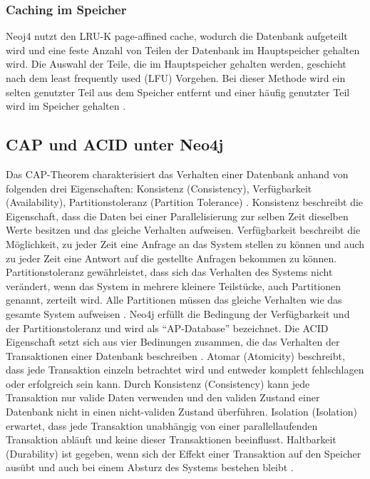 \subsubsection{Caching im Speicher}
Neoj4 nutzt den LRU-K page-affined cache, wodurch die Datenbank aufgeteilt wird und eine feste Anzahl von Teilen der Datenbank im Hauptspeicher gehalten wird. Die Auswahl der Teile, die im Hauptspeicher gehalten werden, geschieht nach dem least frequently used (LFU) Vorgehen. Bei dieser Methode wird ein selten genutzter Teil aus dem Speicher entfernt und einer häufig genutzter Teil wird im Speicher gehalten \parencite{robinson2013graph}.
\subsection{CAP und ACID unter Neo4j}
Das CAP-Theorem charakterisiert das Verhalten einer Datenbank anhand von folgenden drei Eigenschaften: Konsistenz (Consistency), Verfügbarkeit (Availability), Partitionstoleranz (Partition Tolerance)  \parencite{simon2000brewer}. Konsistenz beschreibt die Eigenschaft, dass die Daten bei einer Parallelisierung zur selben Zeit dieselben Werte besitzen und das gleiche Verhalten aufweisen. Verfügbarkeit beschreibt die Möglichkeit, zu jeder Zeit eine Anfrage an das System stellen zu können und auch zu jeder Zeit eine Antwort auf die gestellte Anfragen bekommen zu können. Partitionstoleranz gewährleistet, dass sich das Verhalten des Systems nicht verändert, wenn das System in mehrere kleinere Teilstücke, auch  Partitionen genannt, zerteilt wird. Alle Partitionen müssen das gleiche Verhalten wie das gesamte System aufweisen \parencite{simon2000brewer}. Neo4j erfüllt die Bedingung der Verfügbarkeit und der  Partitionstoleranz \parencite{vukotic2015neo4j} und wird als “AP-Database” bezeichnet. \newline
Die ACID Eigenschaft setzt sich aus vier Bedinungen zusammen, die das Verhalten der Transaktionen einer  Datenbank beschreiben \parencite{haerder1983principles}. Atomar (Atomicity) beschreibt, dass jede Transaktion einzeln betrachtet wird und entweder komplett fehlschlagen oder erfolgreich sein kann. Durch Konsistenz (Consistency) kann jede Transaktion nur valide Daten verwenden und den validen Zustand einer Datenbank nicht in einen nicht-validen Zustand überführen. Isolation (Isolation) erwartet, dass jede Transaktion unabhängig von einer parallellaufenden Transaktion abläuft und keine dieser Transaktionen beeinflusst. Haltbarkeit (Durability) ist gegeben, wenn sich der Effekt einer Transaktion auf den Speicher ausübt und auch bei einem Absturz des Systems bestehen bleibt \parencite{haerder1983principles}. \newline
